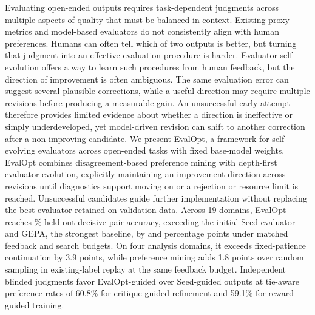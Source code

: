 Evaluating open-ended outputs requires task-dependent judgments across multiple aspects of quality that must be balanced in context. Existing proxy metrics and model-based evaluators do not consistently align with human preferences. Humans can often tell which of two outputs is better, but turning that judgment into an effective evaluation procedure is harder. Evaluator self-evolution offers a way to learn such procedures from human feedback, but the direction of improvement is often ambiguous. The same evaluation error can suggest several plausible corrections, while a useful direction may require multiple revisions before producing a measurable gain. An unsuccessful early attempt therefore provides limited evidence about whether a direction is ineffective or simply underdeveloped, yet model-driven revision can shift to another correction after a non-improving candidate. We present EvalOpt, a framework for self-evolving evaluators across open-ended tasks with fixed base-model weights. EvalOpt combines disagreement-based preference mining with depth-first evaluator evolution, explicitly maintaining an improvement direction across revisions until diagnostics support moving on or a rejection or resource limit is reached. Unsuccessful candidates guide further implementation without replacing the best evaluator retained on validation data. Across 19 domains, EvalOpt reaches \ResultPair\% held-out decisive-pair accuracy, exceeding the initial Seed evaluator and GEPA, the strongest baseline, by \ResultSeedGain{} and \ResultGepaGain{} percentage points under matched feedback and search budgets. On four analysis domains, it exceeds fixed-patience continuation by 3.9 points, while preference mining adds 1.8 points over random sampling in existing-label replay at the same feedback budget. Independent blinded judgments favor EvalOpt-guided over Seed-guided outputs at tie-aware preference rates of 60.8\% for critique-guided refinement and 59.1\% for reward-guided training.
